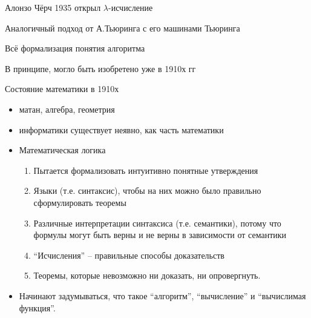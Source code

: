 



%
%


\begin{frame}
  Алонзо Чёрч 1935   открыл $\lambda$-исчисление


  Аналогичный подход от А.Тьюринга с его машинами Тьюринга

  Всё формализация понятия алгоритма


  В принципе, могло быть изобретено уже в 1910х гг
\end{frame}

\begin{frame}{Состояние математики в 1910х}
  \begin{itemize}
    \item матан, алгебра, геометрия
    \item информатики существует неявно, как часть математики
    \item Математическая логика
    \begin{enumerate}
      \item Пытается формализовать интуитивно понятные утверждения
      \item Языки (т.е. синтаксис), чтобы на них можно было правильно сформулировать теоремы
      \item Различные интерпретации синтаксиса (т.е. семантики), потому что формулы могут быть верны и не верны в зависимости от семантики
      \item ``Исчисления'' -- правильные способы доказательств
      \item Теоремы, которые невозможно ни доказать, ни опровергнуть.
    \end{enumerate}
  \item Начинают задумываться, что такое ``алгоритм'', ``вычисление'' и ``вычислимая функция''.
  \end{itemize}
\end{frame}

